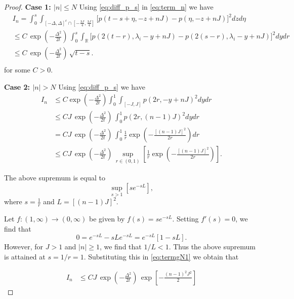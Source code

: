 \documentclass[12pt]{amsart}
\numberwithin{equation}{section}
\theoremstyle{definition}
\numberwithin{equation}{section}
\begin{document}
\begin{proof}
\noindent
\textbf{Case 1: $|n|\le N$}
Using \eqref{eq:diff_p_s} in \eqref{eq:term_n} we have
\begin{align} \label{eq:termlN}
  & I_n =\int_{0}^{s}
    \int_{[-\Delta,\Delta]^c\cap\left[-\frac{3J}{4},\frac{3J}{4}\right]}
    \Big[p(t-s +\eta,-z+nJ)-p(\eta,-z+nJ)\Big]^2dzd\eta \nonumber\\
  &\le C\,\exp\left(-\frac{\Delta^2}{2t}\right)\, \int_0^s\int_{\mathbb{R}}
\Big[ p(2(t-r),{\lambda}_i-y+nJ) 
  - p(2(s-r),{\lambda}_i-y+nJ)\Big]^2dydr \nonumber\\
&\le C\,\exp\left(-\frac{\Delta^2}{2t}\right)\,\sqrt{t-s}. \nonumber \\  
\end{align}
for some $C>0$.

\textbf{Case 2: $|n|>N$}
Using \eqref{eq:diff_p_s} we have
\begin{align} \label{eq:termgN1} 
I_n & \leq C \exp\left(-\frac{\Delta^2}{2t}\right)\int_0^1 \int_{[-J,J]}  p(2r,-y+nJ)^2 dydr  \nonumber\\
&\le CJ\,\exp\left(-\frac{\Delta^2}{2t}\right)\,\int_0^1 p(2r,(n-1)J)^2 dydr  \nonumber \\
&= CJ\, \exp\left(-\frac{\Delta^2}{2t}\right)\,\int_0^1 
     \frac{1}{r}\exp\left(-\frac{[(n-1)J]^2}{2r}\right)dr  \nonumber\\
&\le CJ\,\exp\left(-\frac{\Delta^2}{2t}\right)\,\sup_{r\in(0,1)}
     \left[\frac{1}{r}\exp\left(-\frac{[(n-1)J]^2}{2r}\right)\right].
\end{align}

The above supremum is equal to 
\begin{equation*}
\sup_{s>1}\left[se^{-sL}\right],  
\end{equation*}
where $s=\frac{1}{r}$ and $L=[(n-1)J]^2.$

Let $f: (1,\infty) \rightarrow (0,\infty)$ be given by $f(s)=se^{-sL}$.  Setting $f'(s)=0$, we find that 
\begin{equation*}
0 = e^{-sL} - sLe^{-sL} = e^{-sL}[1-sL].  
\end{equation*}
However, for $J>1$ and $|n|\ge1$, we find that $1/L<1$. Thus the above supremum is attained at $s=1/r=1$. Substituting this in \eqref{eq:termgN1} we obtain that 

\begin{align} \label{eq:termgN}
I_n&\le CJ\,\exp\left(-\frac{\Delta^2}{2t}\right)\,\exp\left[-\frac{(n-1)^2J^2}{2}\right]  
\end{align}


\end{proof}
\end{document}
